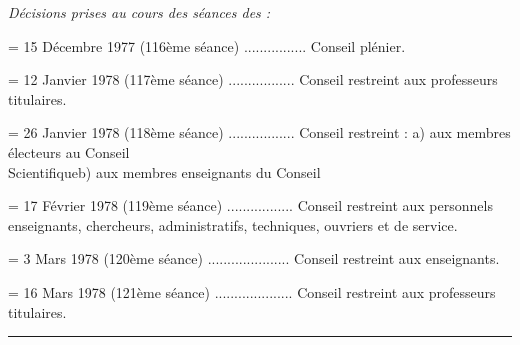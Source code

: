 \textit{Décisions prises au cours des séances des :}

= 15 Décembre 1977 (116ème séance) ................ Conseil plénier.

= 12 Janvier 1978 (117ème séance) ................. Conseil restreint aux professeurs titulaires.

= 26 Janvier 1978 (118ème séance) ................. Conseil restreint : a) aux membres électeurs au Conseil\\
\hspace*{1em}Scientifique\qquad b) aux membres enseignants du Conseil

= 17 Février 1978 (119ème séance) ................. Conseil restreint aux personnels enseignants, chercheurs, administratifs, techniques, ouvriers et de service.

= 3 Mars 1978 (120ème séance) ..................... Conseil restreint aux enseignants.

= 16 Mars 1978 (121ème séance) .................... Conseil restreint aux professeurs titulaires.

\rule{1em}{.8pt}


